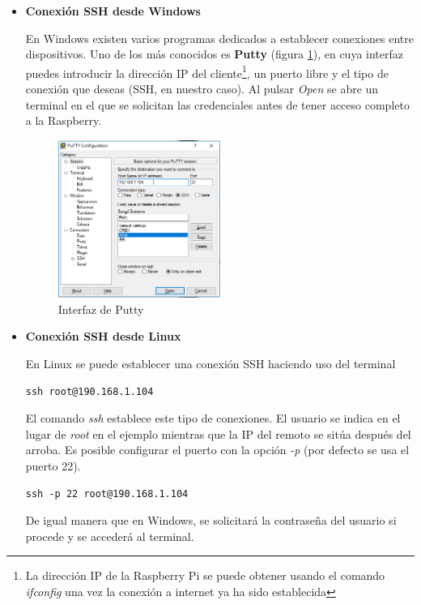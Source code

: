 \begin{itemize}
\item \textbf{Conexión SSH desde Windows}

En Windows existen varios programas dedicados a establecer conexiones entre dispositivos. Uno de los más conocidos es \textbf{Putty} (figura \ref{fig:putty}), en cuya interfaz puedes introducir la dirección IP del cliente\footnote{La dirección IP de la Raspberry Pi se puede obtener usando el comando \textit{ifconfig} una vez la conexión a internet ya ha sido establecida}, un puerto libre y el tipo de conexión que deseas (SSH, en nuestro caso). Al pulsar \textit{Open} se abre un terminal en el que se solicitan las credenciales antes de tener acceso completo a la Raspberry.

\begin{figure}[tb]
\centering
\includegraphics[width=0.5\textwidth]{figuras/Putty.png}
\caption{Interfaz de Putty}
\label{fig:putty}
\end{figure}

\item \textbf{Conexión SSH desde Linux}

En Linux se puede establecer una conexión SSH haciendo uso del terminal

\begin{lstlisting}[frame=single, label=command:ssh]
ssh root@190.168.1.104
\end{lstlisting}

El comando \textit{ssh} establece este tipo de conexiones. El usuario se indica en el lugar de \textit{root} en el ejemplo mientras que la IP del remoto se sitúa después del arroba. Es posible configurar el puerto con la opción \textit{-p} (por defecto se usa el puerto 22).

\begin{lstlisting}[frame=single, label=command:ssh]
ssh -p 22 root@190.168.1.104
\end{lstlisting}

De igual manera que en Windows, se solicitará la contraseña del usuario si procede y se accederá al terminal.

\end{itemize}

